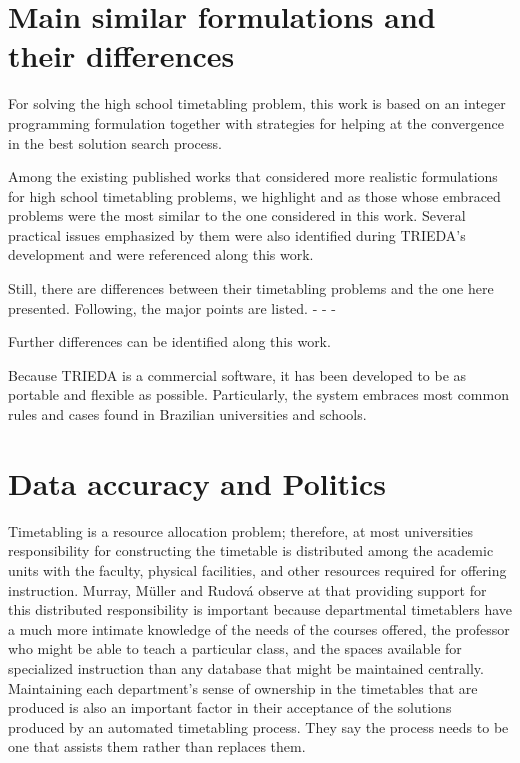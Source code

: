 

\section{Main similar formulations and their differences}

For solving the high school timetabling problem, this work is based on an integer programming formulation together with strategies for helping at the convergence in the best solution search process.

Among the existing published works that considered more realistic formulations for high school timetabling problems, we highlight \cite{Birbas2009} and \cite{Birbas2009} as those whose embraced problems were the most similar to the one considered in this work. Several practical issues emphasized by them were also identified during TRIEDA's development and were referenced along this work.

Still, there are differences between their timetabling problems and the one here presented. Following, the major points are listed.
-
-
-

Further differences can be identified along this work.

Because TRIEDA is a commercial software, it has been developed to be as portable and flexible as possible. Particularly, the system embraces most common rules and cases found in Brazilian universities and schools.


\section{Data accuracy and Politics}

Timetabling is a resource allocation problem; therefore, at most universities responsibility for constructing the timetable is distributed among the academic units with the faculty, physical facilities, and other resources required for offering instruction. Murray, M\"{u}ller and Rudov\'{a} observe at \cite{Murray2007} that providing support for this distributed responsibility is important because departmental timetablers have a much more intimate knowledge of the needs of the courses offered, the professor who might be able to teach a particular class, and the spaces available for specialized instruction than any database that might be maintained centrally. Maintaining each department's sense of ownership in the timetables that are produced is also an important factor in their acceptance of the solutions produced by an automated timetabling process. They say the process needs to be one that assists them rather than replaces them.

